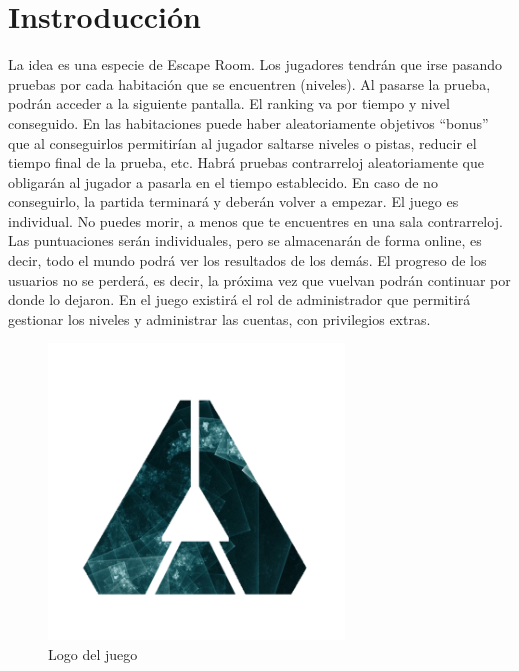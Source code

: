 \section{Instroducción}\label{sec:intro}


La idea es una especie de Escape Room. Los jugadores tendrán que irse pasando pruebas por cada habitación que se encuentren (niveles). Al pasarse la prueba, podrán acceder a la siguiente pantalla. El ranking va por tiempo y nivel conseguido. En las habitaciones puede haber aleatoriamente objetivos “bonus” que al conseguirlos permitirían al jugador saltarse niveles o pistas, reducir el tiempo final de la prueba, etc.
Habrá pruebas contrarreloj aleatoriamente que obligarán al jugador a pasarla en el tiempo establecido. En caso de no conseguirlo, la partida terminará y deberán volver a empezar.
El juego es individual. No puedes morir, a menos que te encuentres en una sala contrarreloj. 
Las puntuaciones serán individuales, pero se almacenarán de forma online, es decir, todo el mundo podrá ver los resultados de los demás. 
El progreso de los usuarios no se perderá, es decir, la próxima vez que vuelvan podrán continuar por donde lo dejaron.
En el juego existirá el rol de administrador que permitirá gestionar los niveles y administrar las cuentas, con privilegios extras.



\begin{figure}[ht]
  \centering
  \includegraphics[width=0.7\textwidth]{./imatges/logo.png}
  \caption{Logo del juego}
  \label{fig:gamelogo}
\end{figure}
